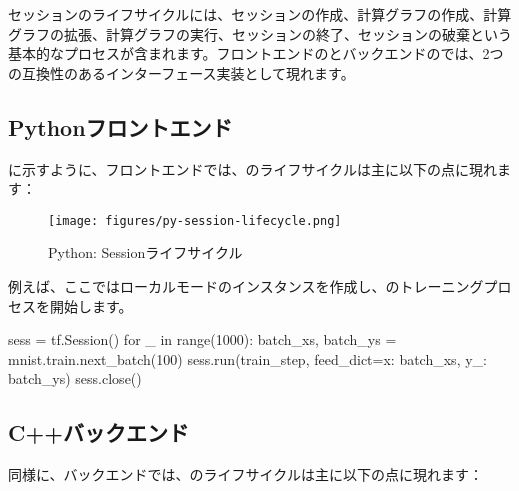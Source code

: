\begin{content}

セッションのライフサイクルには、セッションの作成、計算グラフの作成、計算グラフの拡張、計算グラフの実行、セッションの終了、セッションの破棄という基本的なプロセスが含まれます。フロントエンドのとバックエンドの\cpp{}では、2つの互換性のあるインターフェース実装として現れます。

\subsection{Pythonフロントエンド}

に示すように、フロントエンドでは、のライフサイクルは主に以下の点に現れます：

\begin{enum}
    \begin{enum}
    \end{enum}
\end{enum}

\begin{figure}[H]
\centering
\texttt{[image: figures/py-session-lifecycle.png]}
\caption{Python: Sessionライフサイクル}
 \label{fig:py-session-lifecycle}
\end{figure}

例えば、ここではローカルモードのインスタンスを作成し、のトレーニングプロセスを開始します。

\begin{leftbar}
\begin{python}
sess = tf.Session()
for _ in range(1000):
  batch_xs, batch_ys = mnist.train.next_batch(100)
  sess.run(train_step, feed_dict={x: batch_xs, y_: batch_ys})
sess.close()
\end{python}
\end{leftbar}

\subsection{C++バックエンド}

同様に、\cpp{}バックエンドでは、のライフサイクルは主に以下の点に現れます：


\end{content}
